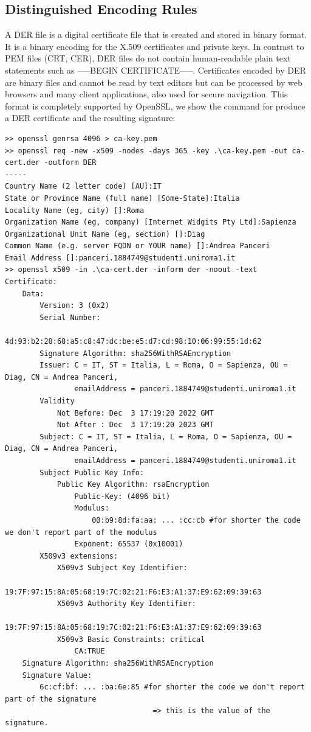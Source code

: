 \documentclass{article}
\begin{document}
\subsection{Distinguished Encoding Rules}
A DER file is a digital certificate file that is created and stored in binary format. It is a binary encoding for the X.509 certificates and private keys. In contrast to PEM files (CRT, CER), DER files do not contain human-readable plain text statements such as —–BEGIN CERTIFICATE—–. Certificates encoded by DER are binary files and cannot be read by text editors but can be processed by web browsers and many client applications, also used for secure navigation. This format is completely supported by OpenSSL, we show the command for produce a DER certificate and the resulting signature:\\
\begin{lstlisting}[basicstyle=\tiny]
>> openssl genrsa 4096 > ca-key.pem
>> openssl req -new -x509 -nodes -days 365 -key .\ca-key.pem -out ca-cert.der -outform DER
-----
Country Name (2 letter code) [AU]:IT
State or Province Name (full name) [Some-State]:Italia
Locality Name (eg, city) []:Roma
Organization Name (eg, company) [Internet Widgits Pty Ltd]:Sapienza
Organizational Unit Name (eg, section) []:Diag
Common Name (e.g. server FQDN or YOUR name) []:Andrea Panceri
Email Address []:panceri.1884749@studenti.uniroma1.it
>> openssl x509 -in .\ca-cert.der -inform der -noout -text
Certificate:
    Data:
        Version: 3 (0x2)
        Serial Number:
            4d:93:b2:28:68:a5:c8:47:dc:be:e5:d7:cd:98:10:06:99:55:1d:62
        Signature Algorithm: sha256WithRSAEncryption
        Issuer: C = IT, ST = Italia, L = Roma, O = Sapienza, OU = Diag, CN = Andrea Panceri,
                emailAddress = panceri.1884749@studenti.uniroma1.it
        Validity
            Not Before: Dec  3 17:19:20 2022 GMT
            Not After : Dec  3 17:19:20 2023 GMT
        Subject: C = IT, ST = Italia, L = Roma, O = Sapienza, OU = Diag, CN = Andrea Panceri,
                emailAddress = panceri.1884749@studenti.uniroma1.it
        Subject Public Key Info:
            Public Key Algorithm: rsaEncryption
                Public-Key: (4096 bit)
                Modulus:
                    00:b9:8d:fa:aa: ... :cc:cb #for shorter the code we don't report part of the modulus
                Exponent: 65537 (0x10001)
        X509v3 extensions:
            X509v3 Subject Key Identifier:
                19:7F:97:15:8A:05:68:19:7C:02:21:F6:E3:A1:37:E9:62:09:39:63
            X509v3 Authority Key Identifier:
                19:7F:97:15:8A:05:68:19:7C:02:21:F6:E3:A1:37:E9:62:09:39:63
            X509v3 Basic Constraints: critical
                CA:TRUE
    Signature Algorithm: sha256WithRSAEncryption
    Signature Value:
        6c:cf:bf: ... :ba:6e:85 #for shorter the code we don't report part of the signature 
                                  => this is the value of the signature.
\end{lstlisting}
\end{document}
